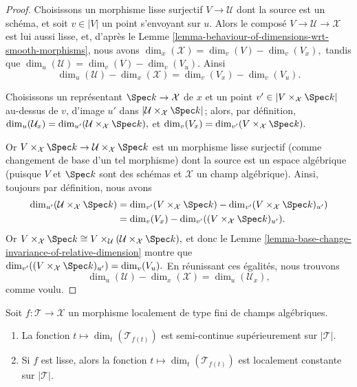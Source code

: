 \begin{proof}
Choisissons un morphisme lisse surjectif $V \to \mathcal{U}$ dont la source
est un schéma, et soit $v\in |V|$ un point s'envoyant sur $u$.
Alors le composé $V \to \mathcal{U} \to \mathcal{X}$ est lui aussi lisse,
et, d'après le Lemme \ref{lemma-behaviour-of-dimensions-wrt-smooth-morphisms},
nous avons $\dim_x(\mathcal{X}) = \dim_v(V) - \dim_v(V_x),$
tandis que $\dim_u(\mathcal{U}) = \dim_v(V) - \dim_v(V_u).$
Ainsi
$$
\dim_u(\mathcal{U}) - \dim_x(\mathcal{X}) = \dim_v (V_x) - \dim_v (V_u).
$$

\medskip\noindent
Choisissons un représentant $\Spec k \to \mathcal{X}$ de $x$
et un point $v' \in | V \times_{\mathcal{X}} \Spec k|$ au-dessus de
$v$, d'image $u'$ dans $|\mathcal{U}\times_{\mathcal{X}} \Spec k|$;
alors, par définition,
$\dim_u(\mathcal{U}_x) = \dim_{u'}(\mathcal{U}\times_{\mathcal{X}} \Spec k),$
et
$\dim_v(V_x) = \dim_{v'}(V\times_{\mathcal{X}} \Spec k).$

\medskip\noindent
Or $V\times_{\mathcal{X}} \Spec k \to \mathcal{U}\times_{\mathcal{X}}\Spec k$
est un morphisme lisse surjectif (comme changement de base
d'un tel morphisme) dont la source est un espace algébrique
(puisque $V$ et $\Spec k$ sont des schémas et $\mathcal{X}$
un champ algébrique). Ainsi, toujours par définition,
nous avons
\begin{align*}
\dim_{u'}(\mathcal{U}\times_{\mathcal{X}} \Spec k)
& =
\dim_{v'}(V\times_{\mathcal{X}} \Spec k) -
\dim_{v'}(V \times_{\mathcal{X}} \Spec k)_{u'}) \\
& = \dim_v(V_x) -
\dim_{v'}( (V\times_{\mathcal{X}} \Spec k)_{u'}).
\end{align*}
Or $V\times_{\mathcal{X}} \Spec k \cong
V\times_{\mathcal{U}} (\mathcal{U}\times_{\mathcal{X}} \Spec k),$
et donc le
Lemme \ref{lemma-base-change-invariance-of-relative-dimension}
montre que
$\dim_{v'}((V\times_{\mathcal{X}} \Spec k)_{u'})  = \dim_v(V_u).$
En réunissant ces égalités, nous trouvons
$$
\dim_u(\mathcal{U}) - \dim_x(\mathcal{X}) =
\dim_u(\mathcal{U}_x),
$$
comme voulu.
\end{proof}

\begin{lemma}
\label{lemma-relative-dimension-is-semi-continuous}
Soit $f: \mathcal{T} \to \mathcal{X}$ un morphisme localement de type fini de
champs algébriques.
\begin{enumerate}
\item
La fonction $t \mapsto \dim_t(\mathcal{T}_{f(t)})$ est semi-continue supérieurement
sur $|\mathcal{T}|$.
\item Si $f$ est lisse, alors
la fonction $t \mapsto \dim_t(\mathcal{T}_{f(t)})$ est localement constante
sur $|\mathcal{T}|$.
\end{enumerate}
\end{lemma}

